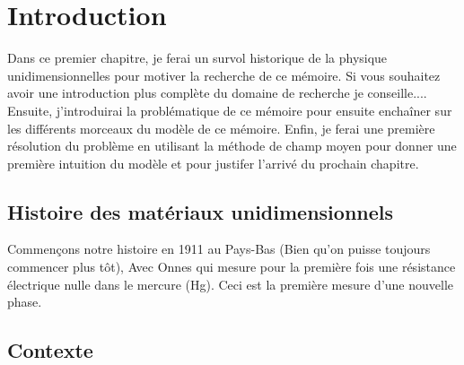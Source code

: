 
\chapter{Introduction}

\begin{Abstract}
    \begin{changemargin}{2cm}{2cm}
    Dans ce premier chapitre, je ferai un survol historique de la physique unidimensionnelles pour motiver la recherche de ce mémoire. Si vous souhaitez avoir une introduction plus complète du domaine de recherche je conseille.... Ensuite, j'introduirai la problématique de ce mémoire pour ensuite enchaîner sur les différents morceaux du modèle de ce mémoire. Enfin, je ferai une première résolution du problème en utilisant la méthode de champ moyen pour donner une première intuition du modèle et pour justifer l'arrivé du prochain chapitre.
    \end{changemargin}
\end{Abstract}


\section{Histoire des matériaux unidimensionnels}
Commençons notre histoire en 1911 au Pays-Bas (Bien qu'on puisse toujours commencer plus tôt), Avec Onnes qui mesure pour la première fois une résistance électrique nulle dans le mercure (Hg). Ceci est la première mesure d'une nouvelle phase.
\section{Contexte}
